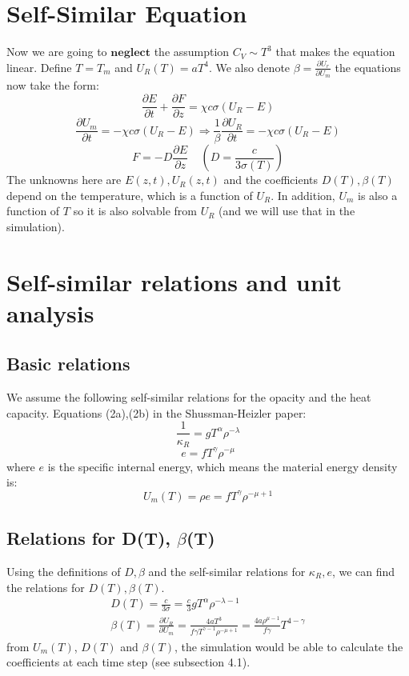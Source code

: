 \documentclass{article}
\begin{document}
\section{Self-Similar Equation}
Now we are going to $\boldsymbol{neglect}$ the assumption $C_V\sim T^3$ that makes the equation linear. Define $T=T_m$ and $\boxed{U_R(T) = aT^4}$. We also denote $\beta = \frac{\partial U_r}{\partial U_m}$ the equations now take the form:
\begin{equation}
    \frac{\partial{E}}{\partial t}+\frac{\partial F}{\partial  z} = \chi c\sigma(U_R-E) 
\end{equation}
\begin{equation}
    \frac{\partial U_m}{\partial t}=-\chi c\sigma (U_R-E)\Rightarrow
    \frac{1}{\beta} \frac{\partial U_R}{\partial t}=-\chi c\sigma (U_R-E)
\end{equation}
\begin{equation}
    F=-D\frac{\partial E}{\partial z}\;\;\;\;\left(D=\frac{c}{3\sigma(T)}\right)
\end{equation}
The unknowns here are $E(z,t),U_R(z,t)$ and the coefficients $D(T),\beta(T)$ depend on the temperature, which is a function of $U_R$.
In addition, $U_m$ is also a function of $T$ so it is also solvable from $U_R$ (and we will use that in the simulation).

\section{Self-similar relations and unit analysis}
\subsection{Basic relations}
We assume the following self-similar relations for the opacity and the heat capacity.
Equations (2a),(2b) in the Shussman-Heizler paper:
\begin{equation}
    \frac{1}{\kappa_R} = g T^\alpha \rho^{-\lambda}
\end{equation}
\begin{equation}
    e = f T^\gamma \rho^{-\mu}
\end{equation}
where $e$ is the specific internal energy, which means the material energy density is:
\begin{equation}
    U_m(T) = \rho e = f T^\gamma \rho^{-\mu + 1}
\end{equation}
\subsection{Relations for D(T), $\beta$(T)}
Using the definitions of $D,\beta$ and the self-similar relations for $\kappa_R,e$, we can find the relations for $D(T),\beta(T)$.
\begin{gather}
    D(T)=\frac{c}{3\sigma}=\frac{c}{3}gT^\alpha\rho^{-\lambda -1} \\
    \beta(T) = \frac{\partial U_R}{\partial U_m} = \frac{4aT^3}{f\gamma T^{\gamma-1}\rho^{-\mu+1}}=\frac{4a\rho^{\mu-1}}{f\gamma }T^{4-\gamma}
\end{gather}
from $U_m(T)$, $D(T)$ and $\beta(T)$, the simulation would be able to calculate the coefficients at each time step (see subsection 4.1).
\end{document}
